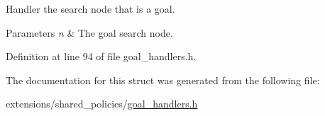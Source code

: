 Handler the search node that is a goal. 


\begin{DoxyParams}{Parameters}
{\em n} & The goal search node. \\
\hline
\end{DoxyParams}


Definition at line 94 of file goal\+\_\+handlers.\+h.



The documentation for this struct was generated from the following file\+:\begin{DoxyCompactItemize}
\item 
extensions/shared\+\_\+policies/\hyperlink{goal__handlers_8h}{goal\+\_\+handlers.\+h}\end{DoxyCompactItemize}
